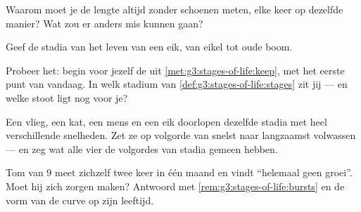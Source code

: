 \begin{exercise}[$\star$]\label{exo:g3:stages-of-life:6}
Waarom moet je de lengte altijd zonder schoenen meten, elke keer op
dezelfde manier? Wat zou er anders mis kunnen gaan?
\end{exercise}

\begin{exercise}[$\star$]\label{exo:g3:stages-of-life:7}
Geef de stadia van het leven van een eik, van eikel tot oude boom.
\end{exercise}

\begin{exercise}[$\star$]\label{exo:g3:stages-of-life:8}
Probeer het: begin voor jezelf de  uit
\cref{met:g3:stages-of-life:keep}, met het eerste punt van vandaag. In
welk stadium van \cref{def:g3:stages-of-life:stages} zit jij --- en
welke stoot ligt nog voor je?
\end{exercise}

\begin{exercise}[$\star\star$]\label{exo:g3:stages-of-life:9}
Een vlieg, een kat, een mens en een eik doorlopen dezelfde stadia met
heel verschillende snelheden. Zet ze op volgorde van snelst naar
langzaamst volwassen --- en zeg wat alle vier de volgordes van stadia
gemeen hebben.
\end{exercise}

\begin{exercise}[$\star\star$]\label{exo:g3:stages-of-life:10}
Tom van $9$ meet zichzelf twee keer in één maand en vindt ``helemaal
geen groei''. Moet hij zich zorgen maken? Antwoord met
\cref{rem:g3:stages-of-life:bursts} en de vorm van de curve op zijn
leeftijd.
\end{exercise}
